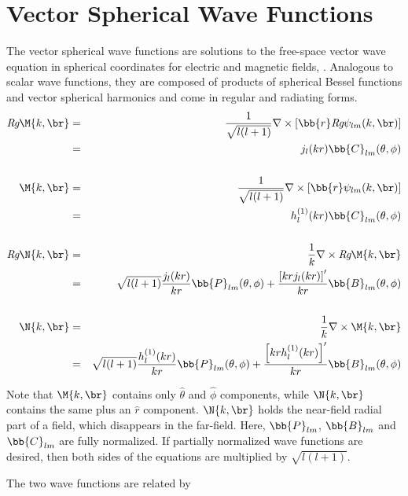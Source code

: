\section{Vector Spherical Wave Functions}
\label{sec:vecsphwave}
The vector spherical wave functions are solutions to the free-space vector wave equation in spherical coordinates for electric and magnetic fields, \cite{chew1995waves, tsang2000scattering}.  Analogous to scalar wave functions, they are composed of products of spherical Bessel functions and vector spherical harmonics and come in regular and radiating forms. 
\begin{eqnarray}
\textit{Rg}\M{k,\br} &=& \dfrac{1}{\sqrt{l(l+1)}}\nabla \times \left[ \bb{r} \textit{Rg}\psi_{lm}(k,\br)\right]  \\
\ &= & j_l(kr) \bb{C}_{lm}(\theta,\phi) \\ 
\ & \ & \  \nonumber  \\
\M{k,\br} &=& \dfrac{1}{\sqrt{l(l+1)}}\nabla \times \left[ \bb{r} \psi_{lm}(k,\br)\right]  \\
\ &= & h_l^{(1)}(kr) \bb{C}_{lm}(\theta,\phi) \\
\ & \ & \  \nonumber \\
\textit{Rg}\N{k,\br} &=&  \dfrac{1}{k} \nabla \times \textit{Rg}\M{k,\br}  \\
\ &=&  \sqrt{l(l+1)}\dfrac{j_l(kr)}{kr} \bb{P}_{lm} (\theta,\phi) + \dfrac{\left[kr j_l(kr)\right]'}{kr} \bb{B}_{lm}(\theta,\phi) \\
\ & \ & \  \nonumber \\
\N{k,\br} &=&  \dfrac{1}{k} \nabla \times \M{k,\br}  \\
\ &=&  \sqrt{l(l+1)}\dfrac{h_l^{(1)}(kr)}{kr} \bb{P}_{lm} (\theta,\phi) + \dfrac{\left[kr h_l^{(1)}(kr)\right]'}{kr} \bb{B}_{lm}(\theta,\phi)  
\end{eqnarray}

Note that $\M{k,\br}$ contains only $\hat\theta$ and $\hat\phi$ components, while $\N{k,\br}$ contains the same plus an $\hat r$ component.  $\N{k,\br}$ holds the near-field radial part of a field, which disappears in the far-field.  Here, $\bb{P}_{lm}$, $\bb{B}_{lm}$ and $\bb{C}_{lm}$ are fully normalized. If partially normalized wave functions are desired, then both sides of the equations are multiplied by $\sqrt{l(l+1)}$. 


The two wave functions are related by 

